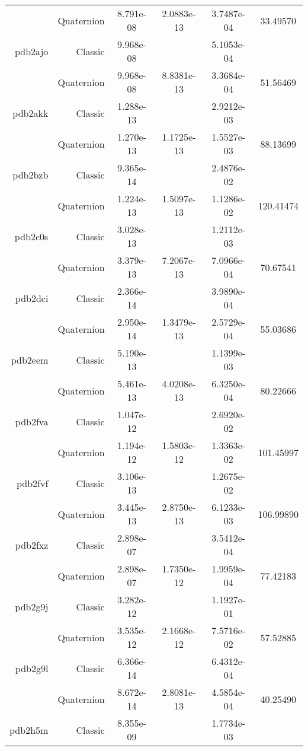 \begin{xltabular}{\textwidth}{r|rS[table-format=1.3e+2]S[table-format=1.4e+2]S[table-format=1.4e+2]S[table-format=-1.5]}
& Quaternion & 8.791e-08 & 2.0883e-13 & 3.7487e-04 & 33.49570\\  \addlinespace
pdb2ajo & Classic & 9.968e-08 &  & 5.1053e-04 & \\
& Quaternion & 9.968e-08 & 8.8381e-13 & 3.3684e-04 & 51.56469\\  \addlinespace
pdb2akk & Classic & 1.288e-13 &  & 2.9212e-03 & \\
& Quaternion & 1.270e-13 & 1.1725e-13 & 1.5527e-03 & 88.13699\\  \addlinespace
pdb2bzb & Classic & 9.365e-14 &  & 2.4876e-02 & \\
& Quaternion & 1.224e-13 & 1.5097e-13 & 1.1286e-02 & 120.41474\\  \addlinespace
pdb2c0s & Classic & 3.028e-13 &  & 1.2112e-03 & \\
& Quaternion & 3.379e-13 & 7.2067e-13 & 7.0966e-04 & 70.67541\\  \addlinespace
pdb2dci & Classic & 2.366e-14 &  & 3.9890e-04 & \\
& Quaternion & 2.950e-14 & 1.3479e-13 & 2.5729e-04 & 55.03686\\  \addlinespace
pdb2eem & Classic & 5.190e-13 &  & 1.1399e-03 & \\
& Quaternion & 5.461e-13 & 4.0208e-13 & 6.3250e-04 & 80.22666\\  \addlinespace
pdb2fva & Classic & 1.047e-12 &  & 2.6920e-02 & \\
& Quaternion & 1.194e-12 & 1.5803e-12 & 1.3363e-02 & 101.45997\\  \addlinespace
pdb2fvf & Classic & 3.106e-13 &  & 1.2675e-02 & \\
& Quaternion & 3.445e-13 & 2.8750e-13 & 6.1233e-03 & 106.99890\\  \addlinespace
pdb2fxz & Classic & 2.898e-07 &  & 3.5412e-04 & \\
& Quaternion & 2.898e-07 & 1.7350e-12 & 1.9959e-04 & 77.42183\\  \addlinespace
pdb2g9j & Classic & 3.282e-12 &  & 1.1927e-01 & \\
& Quaternion & 3.535e-12 & 2.1668e-12 & 7.5716e-02 & 57.52885\\  \addlinespace
pdb2g9l & Classic & 6.366e-14 &  & 6.4312e-04 & \\
& Quaternion & 8.672e-14 & 2.8081e-13 & 4.5854e-04 & 40.25490\\  \addlinespace
pdb2h5m & Classic & 8.355e-09 &  & 1.7734e-03 & \\

\end{xltabular}
